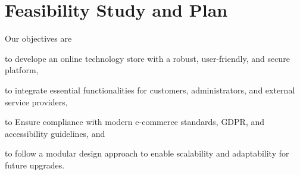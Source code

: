 \documentclass[a4paper,journal]{IEEEtran}
\begin{document}
%



\section{Feasibility Study and Plan}
Our objectives are
\begin{enumerate*}
  \item to develope an online technology store with a robust, user-friendly,
    and secure platform,
  \item to integrate essential functionalities for customers, administrators,
    and external service providers,
  \item to Ensure compliance with modern e-commerce standards, GDPR, and
    accessibility guidelines, and
  \item to follow a modular design approach to enable scalability and
    adaptability for future upgrades.
\end{enumerate*}
\end{document}
